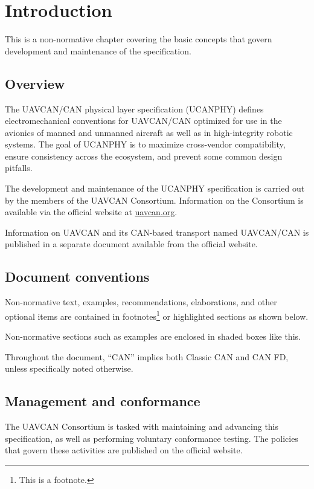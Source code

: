 \chapter{Introduction}\label{sec:introduction}

This is a non-normative chapter covering the basic concepts that govern development and maintenance of
the specification.

\section{Overview}

The UAVCAN/CAN physical layer specification (UCANPHY) defines electromechanical conventions for {UAVCAN/CAN}
optimized for use in the avionics of manned and unmanned aircraft as well as in high-integrity robotic systems.
The goal of UCANPHY is to maximize cross-vendor compatibility, ensure consistency across the ecosystem, and
prevent some common design pitfalls.

The development and maintenance of the UCANPHY specification is carried out by the members of the UAVCAN Consortium.
Information on the Consortium is available via the official website at \href{http://uavcan.org}{uavcan.org}.

Information on UAVCAN and its CAN-based transport named UAVCAN/CAN is published in a separate document
available from the official website.

\section{Document conventions}

Non-normative text, examples, recommendations, elaborations, and other optional items
are contained in footnotes\footnote{This is a footnote.} or highlighted sections as shown below.

\begin{remark}
    Non-normative sections such as examples are enclosed in shaded boxes like this.
\end{remark}

Throughout the document, ``CAN'' implies both Classic CAN and CAN FD, unless specifically noted otherwise.

\section{Management and conformance}

The UAVCAN Consortium is tasked with maintaining and advancing this specification,
as well as performing voluntary conformance testing.
The policies that govern these activities are published on the official website.

